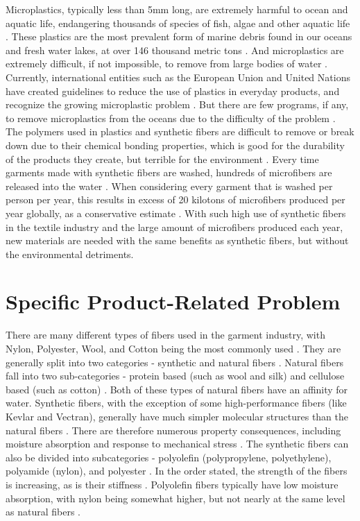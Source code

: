 \documentclass{article}
\begin{document}
Microplastics, typically less than 5mm long, are extremely harmful to ocean and aquatic life, endangering thousands of species of fish, algae and other aquatic life \autocite{gesamp}. These plastics are the most prevalent form of marine debris found in our oceans and fresh water lakes, at over 146 thousand metric tons \autocite{noaamicroplastics}\autocite{iucn}. And microplastics are extremely difficult, if not impossible, to remove from large bodies of water \autocite{noaamicroplastics}. Currently, international entities such as the European Union and United Nations have created guidelines to reduce the use of plastics in everyday products, and recognize the growing microplastic problem \autocite{iucn}. But there are few programs, if any, to remove microplastics from the oceans due to the difficulty of the problem \autocite{iucn}. The polymers used in plastics and synthetic fibers are difficult to remove or break down due to their chemical bonding properties, which is good for the durability of the products they create, but terrible for the environment \autocite{microplasticrelease}. Every time garments made with synthetic fibers are washed, hundreds of microfibers are released into the water \autocite{microplasticrelease}. When considering every garment that is washed per person per year, this results in excess of 20 kilotons of microfibers produced per year globally, as a conservative estimate \autocite{microplasticpollutionlitreview}. With such high use of synthetic fibers in the textile industry and the large amount of microfibers produced each year, new materials are needed with the same benefits as synthetic fibers, but without the environmental detriments.

\section{Specific Product-Related Problem}
There are many different types of fibers used in the garment industry, with Nylon, Polyester, Wool, and Cotton being the most commonly used \autocite{naturalfiberreview}. They are generally split into two categories - synthetic and natural fibers \autocite{naturalfiberreview}\autocite{comparisonsyntheticfibers}. Natural fibers fall into two sub-categories - protein based (such as wool and silk) and cellulose based (such as cotton) \autocite{comparisonsyntheticfibers}. Both of these types of natural fibers have an affinity for water. Synthetic fibers, with the exception of some high-performance fibers (like Kevlar and Vectran), generally have much simpler molecular structures than the natural fibers \autocite{comparisonsyntheticfibers}. There are therefore numerous property consequences, including moisture absorption and response to mechanical stress \autocite{polyesterstrength}. The synthetic fibers can also be divided into subcategories - polyolefin (polypropylene, polyethylene), polyamide (nylon), and polyester \autocite{comparisonsyntheticfibers}. In the order stated, the strength of the fibers is increasing, as is their stiffness \autocite{polyesterstrength}. Polyolefin fibers typically have low moisture absorption, with nylon being somewhat higher, but not nearly at the same level as natural fibers \autocite{naturalfibercompositereview}.
\end{document}
